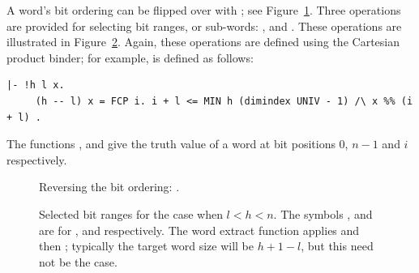 {A word's bit ordering can be flipped over with ; see 
Figure~\ref{fig:reverse}. Three operations are provided for selecting bit 
ranges, or sub-words: ,  and 
.  These operations are illustrated in 
Figure~\ref{fig:bits}.
Again, these operations are defined using the Cartesian product binder; for 
example,  is defined as follows:
\begin{hol}
\begin{verbatim}
|- !h l x.
     (h -- l) x = FCP i. i + l <= MIN h (dimindex UNIV - 1) /\ x %% (i + l) .
\end{verbatim}
\end{hol}

The functions ,  and 
give the truth value of a word at bit positions $0$, $n - 1$ and $i$
respectively.

\begin{figure}
\begin{center}
\caption{Reversing the bit ordering: .}
\label{fig:reverse}
\end{center}
\end{figure}

\begin{figure}
\begin{center}
\caption{Selected bit ranges for the case when $l < h < n$.  The symbols 
\holtxt{--}, \holtxt{<>} and \holtxt{><} are for , 
 and  respectively.  The word extract 
function applies  and then ; typically the
target word size will be $h + 1 - l$, but this need not be the case.}
\label{fig:bits}
\end{center}
\end{figure}

}

